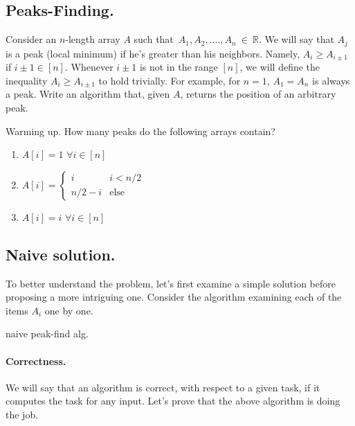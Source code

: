 \subsection{Peaks-Finding.}
\begin{example}
Consider an \(n\)-length array $A$ such that~$A_1,A_2,....,A_n~\in~\mathbb{R}$. We will say that $A_{j}$ is a peak (local minimum) if he's greater than his neighbors. Namely, $A_{i} \ge A_{i\pm1}$ if $i\pm 1 \in [n]$. Whenever $i\pm 1$ is not in the range $[n]$, we will define the inequality $A_{i} \ge A_{i\pm 1}$ to hold trivially. For example, for $n=1$, $A_{1}=A_{n}$ is always a peak. Write an algorithm that, given $A$, returns the position of an arbitrary peak.
\end{example}


\begin{example}{Warming up.} \label{example:func} How many peaks do the following arrays contain?
  \begin{enumerate}
    \item $A[i] = 1$   $\forall i \in [n]$
    \item $A[i] = \begin{cases}
        i & i < n/2 \\
        n/2 - i & \text{else}
      \end{cases}$
    \item $A[i] = i $  $\forall i \in [n]$
  \end{enumerate}
\end{example}

\subsection{Naive solution.}
To better understand the problem, let's first examine a simple solution before proposing a more intriguing one. Consider the algorithm examining each of the items $A_{i}$ one by one.
\begin{algorithm}
\caption{naive peak-find alg.}
  { 
    } 
\end{algorithm}
\paragraph{Correctness.}
We will say that an algorithm is correct, with respect to a given task, if it computes the task for any input. Let's prove that the above algorithm is doing the job. 

